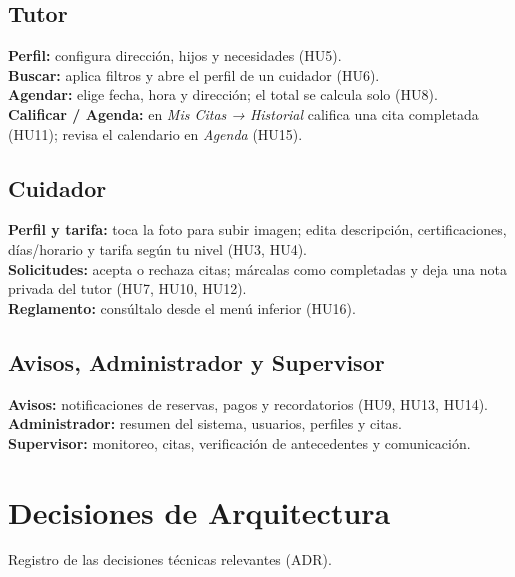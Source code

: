 \documentclass[11pt,a4paper]{article}
\begin{document}
\subsection{Tutor}
\begin{paso}
\textbf{Perfil:} configura dirección, hijos y necesidades (HU5).\\
\textbf{Buscar:} aplica filtros y abre el perfil de un cuidador (HU6).\\
\textbf{Agendar:} elige fecha, hora y dirección; el total se calcula solo (HU8).\\
\textbf{Calificar / Agenda:} en \emph{Mis Citas → Historial} califica una cita
completada (HU11); revisa el calendario en \emph{Agenda} (HU15).
\end{paso}

\subsection{Cuidador}
\begin{paso}
\textbf{Perfil y tarifa:} toca la foto para subir imagen; edita descripción,
certificaciones, días/horario y tarifa según tu nivel (HU3, HU4).\\
\textbf{Solicitudes:} acepta o rechaza citas; márcalas como completadas y deja una
nota privada del tutor (HU7, HU10, HU12).\\
\textbf{Reglamento:} consúltalo desde el menú inferior (HU16).
\end{paso}

\subsection{Avisos, Administrador y Supervisor}
\begin{paso}
\textbf{Avisos:} notificaciones de reservas, pagos y recordatorios (HU9, HU13, HU14).\\
\textbf{Administrador:} resumen del sistema, usuarios, perfiles y citas.\\
\textbf{Supervisor:} monitoreo, citas, verificación de antecedentes y comunicación.
\end{paso}

\section{Decisiones de Arquitectura}
Registro de las decisiones técnicas relevantes (ADR).
\end{document}
